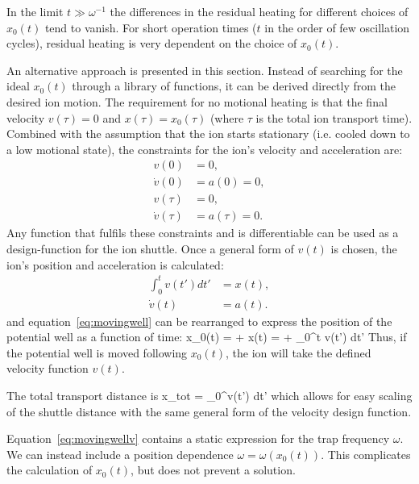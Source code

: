 In the limit $t \gg \omega^{-1}$ the differences in the residual heating for different choices of $x_0(t)$ tend to vanish. For short operation times ($t$ in the order of few oscillation cycles), residual heating is very dependent on the choice of $x_0(t)$.

An alternative approach is presented in this section. Instead of searching for the ideal $x_0(t)$ through a library of functions, it can be derived directly from the desired ion motion. The requirement for no motional heating is that the final velocity $v(\tau) = 0$ and $x(\tau) = x_0(\tau)$ (where $\tau$ is the total ion transport time). Combined with the assumption that the ion starts stationary (i.e. cooled down to a low motional state), the constraints for the ion's velocity and acceleration are:
\begin{align}
v(0) & = 0, \\
\dot v (0) & = a(0) =  0, \\
v(\tau) & = 0, \\
\dot v (\tau)& = a(\tau)  = 0.
\end{align}
Any function that fulfils these constraints and is differentiable can be used as a design-function for the ion shuttle. Once a general form of $v(t)$ is chosen, the ion's position and acceleration is calculated:
\begin{align}
\int_{0}^t v(t') dt' & =  x(t), \\
\dot v (t) & =  a(t).
\end{align}
and equation~\ref{eq:movingwell} can be rearranged to express the position of the potential well as a function of time:
\be
x_0(t) =  + x(t) =   + \int_{0}^t v(t') dt'
\label{eq:movingwellv}
\ee
Thus, if the potential well is moved following $x_0(t)$, the ion will take the defined velocity function $v(t)$.

The total transport distance is
\be
x_{tot} = \int_{0}^\tau v(t') dt'
\ee
which allows for easy scaling of the shuttle distance with the same general form of the velocity design function.

Equation~\ref{eq:movingwellv} contains a static expression for the trap frequency $\omega$. We can instead include a position dependence $\omega = \omega\left(x_0(t)\right)$. This complicates the calculation of $x_0(t)$, but does not prevent a solution.


